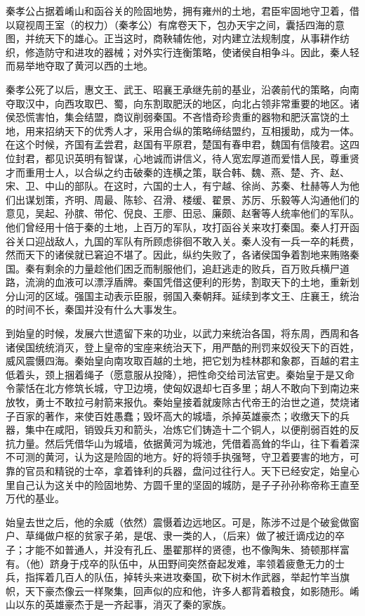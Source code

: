 \documentclass[12pt,UTF-8,openany,a4]{ctexbook}
\begin{document}
\begin{large}
    \yiwen 
    秦孝公占据着崤山和函谷关的险固地势，拥有雍州的土地，君臣牢固地守卫着，借以窥视周王室（的权力）（秦孝公）有席卷天下，包办天宇之间，囊括四海的意图，并统天下的雄心。正当这时，商鞅辅佐他，对内建立法规制度，从事耕作纺织，修造防守和进攻的器械；对外实行连衡策略，使诸侯自相争斗。因此，秦人轻而易举地夺取了黄河以西的土地。
    
    秦孝公死了以后，惠文王、武王、昭襄王承继先前的基业，沿袭前代的策略，向南夺取汉中，向西攻取巴、蜀，向东割取肥沃的地区，向北占领非常重要的地区。诸侯恐慌害怕，集会结盟，商议削弱秦国。不吝惜奇珍贵重的器物和肥沃富饶的土地，用来招纳天下的优秀人才，采用合纵的策略缔结盟约，互相援助，成为一体。在这个时候，齐国有孟尝君，赵国有平原君，楚国有春申君，魏国有信陵君。这四位封君，都见识英明有智谋，心地诚而讲信义，待人宽宏厚道而爱惜人民，尊重贤才而重用士人，以合纵之约击破秦的连横之策，联合韩、魏、燕、楚、齐、赵、宋、卫、中山的部队。在这时，六国的士人，有宁越、徐尚、苏秦、杜赫等人为他们出谋划策，齐明、周最、陈轸、召滑、楼缓、翟景、苏厉、乐毅等人沟通他们的意见，吴起、孙膑、带佗、倪良、王廖、田忌、廉颇、赵奢等人统率他们的军队。他们曾经用十倍于秦的土地，上百万的军队，攻打函谷关来攻打秦国。秦人打开函谷关口迎战敌人，九国的军队有所顾虑徘徊不敢入关。秦人没有一兵一卒的耗费，然而天下的诸侯就已窘迫不堪了。因此，纵约失败了，各诸侯国争着割地来贿赂秦国。秦有剩余的力量趁他们困乏而制服他们，追赶逃走的败兵，百万败兵横尸道路，流淌的血液可以漂浮盾牌。秦国凭借这便利的形势，割取天下的土地，重新划分山河的区域。强国主动表示臣服，弱国入秦朝拜。延续到孝文王、庄襄王，统治的时间不长，秦国并没有什么大事发生。
    
    到始皇的时候，发展六世遗留下来的功业，以武力来统治各国，将东周，西周和各诸侯国统统消灭，登上皇帝的宝座来统治天下，用严酷的刑罚来奴役天下的百姓，威风震慑四海。秦始皇向南攻取百越的土地，把它划为桂林郡和象郡，百越的君主低着头，颈上捆着绳子（愿意服从投降），把性命交给司法官吏。秦始皇于是又命令蒙恬在北方修筑长城，守卫边境，使匈奴退却七百多里；胡人不敢向下到南边来放牧，勇士不敢拉弓射箭来报仇。秦始皇接着就废除古代帝王的治世之道，焚烧诸子百家的著作，来使百姓愚蠢；毁坏高大的城墙，杀掉英雄豪杰；收缴天下的兵器，集中在咸阳，销毁兵刃和箭头，冶炼它们铸造十二个铜人，以便削弱百姓的反抗力量。然后凭借华山为城墙，依据黄河为城池，凭借着高耸的华山，往下看着深不可测的黄河，认为这是险固的地方。好的将领手执强弩，守卫着要害的地方，可靠的官员和精锐的士卒，拿着锋利的兵器，盘问过往行人。天下已经安定，始皇心里自己认为这关中的险固地势、方圆千里的坚固的城防，是子子孙孙称帝称王直至万代的基业。
    
    始皇去世之后，他的余威（依然）震慑着边远地区。可是，陈涉不过是个破瓮做窗户、草绳做户枢的贫家子弟，是氓、隶一类的人，（后来）做了被迁谪戍边的卒子；才能不如普通人，并没有孔丘、墨翟那样的贤德，也不像陶朱、猗顿那样富有。（他）跻身于戍卒的队伍中，从田野间突然奋起发难，率领着疲惫无力的士兵，指挥着几百人的队伍，掉转头来进攻秦国，砍下树木作武器，举起竹竿当旗帜，天下豪杰像云一样聚集，回声似的应和他，许多人都背着粮食，如影随形。崤山以东的英雄豪杰于是一齐起事，消灭了秦的家族。
    

\end{large}
\end{document}
